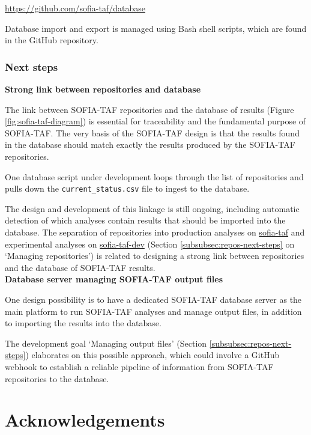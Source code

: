 \documentclass[12pt]{article}
\newcommand\blue[1]{\textcolor{darkblue}{#1}}
\begin{document}
\qquad\blue{\url{https://github.com/sofia-taf/database}}

Database import and export is managed using Bash shell scripts, which are found
in the GitHub repository.

\subsubsection{Next steps}

\textbf{Strong link between repositories and database}

The link between SOFIA-TAF repositories and the database of results (Figure
\ref{fig:sofia-taf-diagram}) is essential for traceability and the fundamental
purpose of SOFIA-TAF. The very basis of the SOFIA-TAF design is that the results
found in the database should match exactly the results produced by the SOFIA-TAF
repositories.

One database script under development loops through the list of repositories and
pulls down the \verb|current_status.csv| file to ingest to the database.

The design and development of this linkage is still ongoing, including automatic
detection of which analyses contain results that should be imported into the
database. The separation of repositories into production analyses on
\blue{\href{https://github.com/sofia-taf}{\sf sofia-taf}} and experimental
analyses on \blue{\href{https://github.com/sofia-taf-dev}{\sf sofia-taf-dev}}
(Section \ref{subsubsec:repos-next-steps} on `Managing repositories') is related
to designing a strong link between repositories and the database of SOFIA-TAF
results.\\[-2ex]

\textbf{Database server managing SOFIA-TAF output files}

One design possibility is to have a dedicated SOFIA-TAF database server as the
main platform to run SOFIA-TAF analyses and manage output files, in addition to
importing the results into the database.

The development goal `Managing output files' (Section
\ref{subsubsec:repos-next-steps}) elaborates on this possible approach, which
could involve a GitHub webhook to establish a reliable pipeline of information
from SOFIA-TAF repositories to the database.

\newpage

\section{Acknowledgements}
\end{document}
